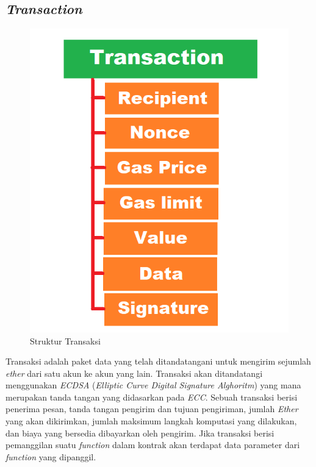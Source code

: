 \subsection{\emph{Transaction}}

\begin{figure} [ht] \centering
  \includegraphics[scale=0.4]{gambar/img-transaction-structure.png}
  \caption{Struktur Transaksi}
  \label{fig:Metaverse}
\end{figure}

Transaksi adalah paket data yang telah ditandatangani untuk mengirim sejumlah \emph{ether} dari satu akun ke akun yang lain. Transaksi akan ditandatangi menggunakan \emph{ECDSA} (\emph{Elliptic Curve Digital Signature Alghoritm}) yang mana merupakan tanda tangan yang didasarkan pada \emph{ECC}. Sebuah transaksi berisi penerima pesan, tanda tangan pengirim dan tujuan pengiriman, jumlah \emph{Ether} yang akan dikirimkan, jumlah maksimum langkah komputasi yang dilakukan, dan biaya yang bersedia dibayarkan oleh pengirim. Jika transaksi berisi pemanggilan suatu \emph{function} dalam kontrak akan terdapat data parameter dari \emph{function} yang dipanggil.  
\parencite{PrustyBuilding}

